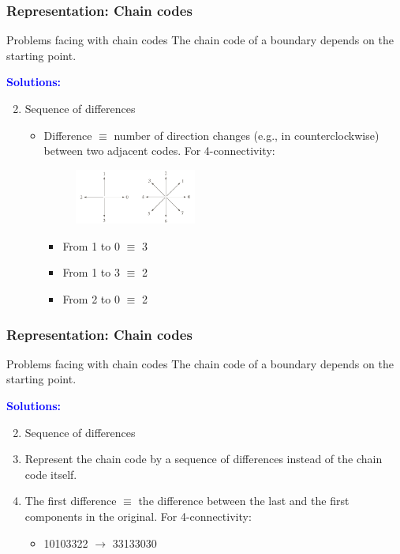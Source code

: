 \documentclass[english,11pt,table,handout]{beamer}
\begin{document}
\frame
{
	\frametitle{Representation: Chain codes}
	\begin{alertblock}{Problems facing with chain codes}
		{
			\large
			The chain code of a boundary depends on the starting point.
		}
		
		\textbf{\textcolor{blue}{Solutions:}}
		\begin{enumerate}
			\setcounter{enumi}{1}
			\item Sequence of differences
			\begin{itemize}
				\item Difference $\equiv$ number of direction changes (e.g., in counterclockwise) between two adjacent codes. For 4-connectivity:
				\begin{figure}[!h]
					\includegraphics[width=4cm]{chaincode_1.png}
				\end{figure}
				\begin{itemize}
				\item From 1 to 0  $\equiv$ 3
				\item From 1 to 3  $\equiv$ 2
				\item From 2 to 0  $\equiv$ 2
			\end{itemize}
			\end{itemize}
			
		\end{enumerate}
		
		
	\end{alertblock}
	
}

\frame
{
	\frametitle{Representation: Chain codes}
	\begin{alertblock}{Problems facing with chain codes}
		{
			\large
			The chain code of a boundary depends on the starting point.
		}
		
		\textbf{\textcolor{blue}{Solutions:}}
		\begin{enumerate}
			\setcounter{enumi}{1}
			\item Sequence of differences
			\item Represent the chain code by a sequence of differences instead of the chain code itself.
			\item The first difference $\equiv$ the difference between the last and the first components in the original. For 4-connectivity:
			\begin{itemize}
				\item 10103322 $\rightarrow$ 33133030
			\end{itemize}
		\end{enumerate}
		
		
	\end{alertblock}
	
	
}
\end{document}
